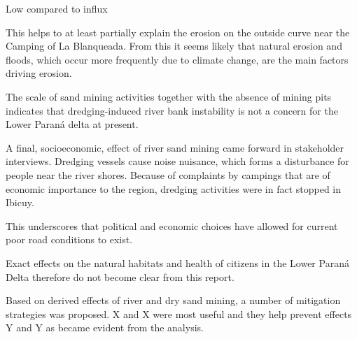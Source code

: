 Low compared to influx







This helps to at least partially explain the erosion on the outside curve near the Camping of La Blanqueada. From this it seems likely that natural erosion and floods, which occur more frequently due to climate change, are the main factors driving erosion.

The scale of sand mining activities together with the absence of mining pits indicates that dredging-induced river bank instability is not a concern for the Lower Paraná delta at present.

 A final, socioeconomic, effect of river sand mining came forward in stakeholder interviews. Dredging vessels cause noise nuisance, which forms a disturbance for people near the river shores. Because of complaints by campings that are of economic importance to the region, dredging activities were in fact stopped in Ibicuy.


This underscores that political and economic choices have allowed for current poor road conditions to exist.

Exact effects on the natural habitats and health of citizens in the Lower Paraná Delta therefore do not become clear from this report.

Based on derived effects of river and dry sand mining, a number of mitigation strategies was proposed. X and X were most useful and they help prevent effects Y and Y as became evident from the analysis.

